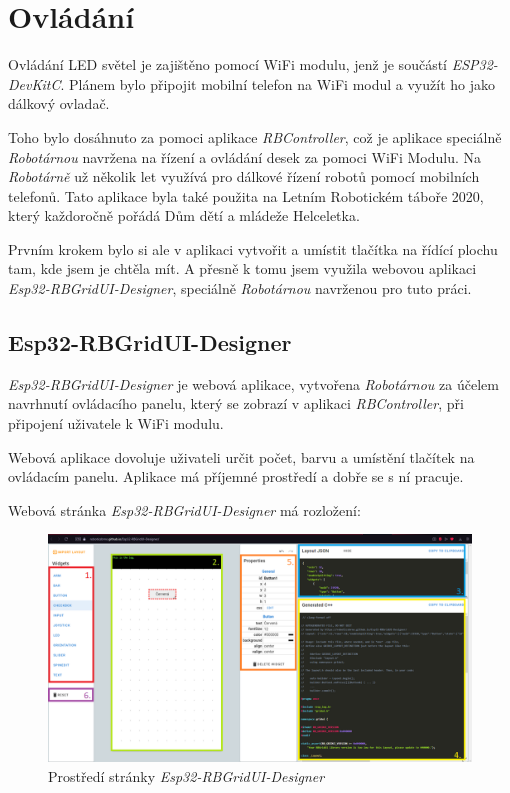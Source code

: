 \chapter{Ovládání}
Ovládání LED světel je zajištěno pomocí WiFi modulu, jenž je součástí \textit{ESP32-DevKitC}. Plánem bylo připojit mobilní telefon na WiFi modul a využít ho jako dálkový ovladač. 

Toho bylo dosáhnuto za pomoci aplikace \textit{RBController}\cite{RBControler}, což je aplikace speciálně \textit{Robotárnou}\cite{robotarna} navržena na řízení a ovládání desek za pomoci WiFi Modulu. Na \textit{Robotárně} už několik let využívá pro dálkové řízení robotů pomocí mobilních telefonů. Tato aplikace byla také použita na Letním Robotickém táboře 2020\cite{tabor}, který každoročně pořádá Dům dětí a mládeže Helceletka\cite{helceletka}.

Prvním krokem bylo si ale v aplikaci vytvořit a umístit tlačítka na řídící plochu tam, kde jsem je chtěla mít. A přesně k tomu jsem využila webovou aplikaci \textit{Esp32-RBGridUI-Designer}, speciálně \textit{Robotárnou} navrženou pro tuto práci.


\section{Esp32-RBGridUI-Designer} 
\textit{Esp32-RBGridUI-Designer}\cite{designer} je webová aplikace, vytvořena \textit{Robotárnou} za účelem navrhnutí ovládacího panelu, který se zobrazí v aplikaci \textit{RBController}, při připojení uživatele k WiFi modulu. 

Webová aplikace dovoluje uživateli určit počet, barvu a umístění tlačítek na ovládacím panelu. Aplikace má příjemné prostředí a dobře se s ní pracuje. 

Webová stránka {\em Esp32-RBGridUI-Designer} má rozložení: 


\begin{figure}[htbp]
	\centering
	\includegraphics[width=1\textwidth]{img/Esp32-RBGridUI-Designer.png}
	\caption{Prostředí stránky {\em Esp32-RBGridUI-Designer}}
\end{figure}

